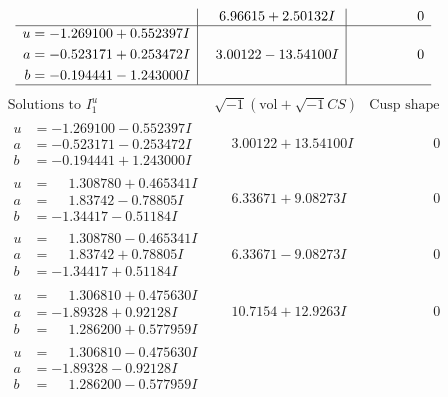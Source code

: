 \documentclass[1p]{elsarticle_modified}
\theoremstyle{definition}
\newcommand{\I}{\sqrt{-1}}
\begin{document}
$$\begin{array}{c|c|c}
 & \phantom{-}6.96615 + 2.50132 I & \phantom{-0.000000 } 0 \\ \hline\begin{aligned}
u &= -1.269100 + 0.552397 I \\
a &= -0.523171 + 0.253472 I \\
b &= -0.194441 - 1.243000 I\end{aligned}
 & \phantom{-}3.00122 - 13.54100 I & \phantom{-0.000000 } 0\\
 \hline 
 \end{array}$$\newpage$$\begin{array}{c|c|c}  
\text{Solutions to }I^u_{1}& \I (\text{vol} + \sqrt{-1}CS) & \text{Cusp shape}\\
 \hline 
\begin{aligned}
u &= -1.269100 - 0.552397 I \\
a &= -0.523171 - 0.253472 I \\
b &= -0.194441 + 1.243000 I\end{aligned}
 & \phantom{-}3.00122 + 13.54100 I & \phantom{-0.000000 } 0 \\ \hline\begin{aligned}
u &= \phantom{-}1.308780 + 0.465341 I \\
a &= \phantom{-}1.83742 - 0.78805 I \\
b &= -1.34417 - 0.51184 I\end{aligned}
 & \phantom{-}6.33671 + 9.08273 I & \phantom{-0.000000 } 0 \\ \hline\begin{aligned}
u &= \phantom{-}1.308780 - 0.465341 I \\
a &= \phantom{-}1.83742 + 0.78805 I \\
b &= -1.34417 + 0.51184 I\end{aligned}
 & \phantom{-}6.33671 - 9.08273 I & \phantom{-0.000000 } 0 \\ \hline\begin{aligned}
u &= \phantom{-}1.306810 + 0.475630 I \\
a &= -1.89328 + 0.92128 I \\
b &= \phantom{-}1.286200 + 0.577959 I\end{aligned}
 & \phantom{-}10.7154 + 12.9263 I & \phantom{-0.000000 } 0 \\ \hline\begin{aligned}
u &= \phantom{-}1.306810 - 0.475630 I \\
a &= -1.89328 - 0.92128 I \\
b &= \phantom{-}1.286200 - 0.577959 I\end{aligned}

\end{array}$$
\end{document}
